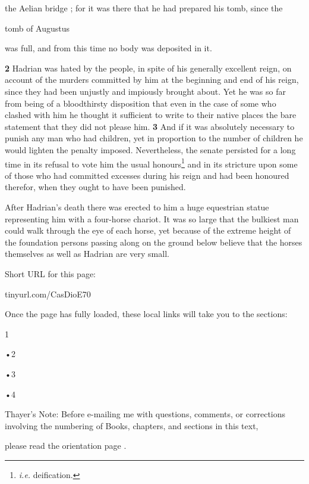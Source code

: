 the Aelian bridge ; for it was there that he had prepared his tomb, since the

tomb of Augustus

was full, and from this time no body was deposited in it.

\textbf{2} Hadrian was hated by the people, in spite of his generally excellent reign, on account of the murders committed by him at the beginning and end of his reign, since they had been unjustly and impiously brought about. Yet he was so far from being of a bloodthirsty disposition that even in the case of some who clashed with him he thought it sufficient to write to their native places the bare statement that they did not please him. \textbf{3} And if it was absolutely necessary to punish any man who had children, yet in proportion to the number of children he would lighten the penalty imposed. Nevertheless, the senate persisted for a long time in its refusal to vote him the usual honours\texthebrew{⁠}\footnote{\emph{i.e.} deification.} and in its stricture upon some of those who had committed excesses during his reign and had been honoured therefor, when they ought to have been punished.


After Hadrian's death there was erected to him a huge equestrian statue representing him with a four-horse chariot. It was so large that the bulkiest man could walk through the eye of each horse, yet because of the extreme height of the foundation persons passing along on the ground below believe that the horses themselves as well as Hadrian are very small.


Short URL for this page:

tinyurl.com/CasDioE70

Once the page has fully loaded, these local links will take you to the sections:

1

\texthebrew{•}2

\texthebrew{•}3

\texthebrew{•}4

Thayer's Note: Before e-mailing me with questions, comments, or corrections involving the numbering of Books, chapters, and sections in this text,

please read the orientation page .

